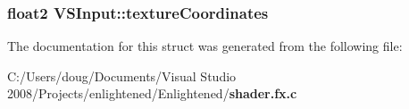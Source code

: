 \subsubsection[{textureCoordinates}]{\setlength{\rightskip}{0pt plus 5cm}float2 {\bf VSInput::textureCoordinates}}\label{struct_v_s_input_a30e05320d62b757f513169849d45410f}


The documentation for this struct was generated from the following file:\begin{DoxyCompactItemize}
\item 
C:/Users/doug/Documents/Visual Studio 2008/Projects/enlightened/Enlightened/{\bf shader.fx.c}\end{DoxyCompactItemize}
